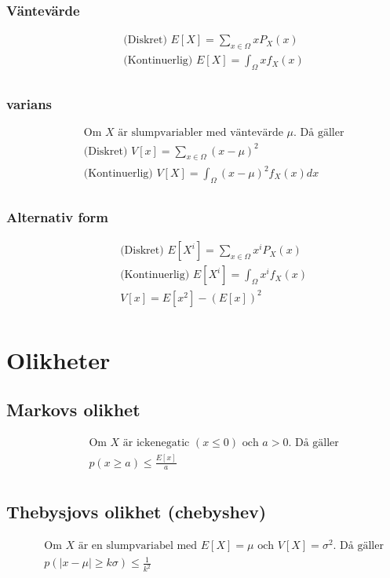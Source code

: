 \subsubsection{Väntevärde}
\begin{align*}
  &\quad  \text{(Diskret) }      E[X] = \sum_{x\in\Omega} x P_X(x) \\
  &\quad  \text{(Kontinuerlig) } E[X] = \int_{\Omega} x f_X(x) \\
\end{align*}

\subsubsection{varians}
\begin{align*}
  &\quad  \text{Om $X$ är slumpvariabler med väntevärde $\mu$. Då gäller} \\
  &\quad  \text{(Diskret) }      V[x] = \sum_{x\in\Omega} (x-\mu)^2  \\
  &\quad  \text{(Kontinuerlig) } V[X] = \int_{\Omega} (x-\mu)^2 f_X(x)dx \\
\end{align*}

\subsubsection{Alternativ form}
\begin{align*}
  &\quad  \text{(Diskret) }      E[X^i] = \sum_{x\in\Omega} x^i P_X(x) \\
  &\quad  \text{(Kontinuerlig) } E[X^i] = \int_{\Omega} x^i f_X(x) \\
  &\quad  V[x]=E[x^2]-(E[x])^2 \\
\end{align*}

\section{Olikheter}
\subsection{Markovs olikhet}
\begin{align*}
  &\quad  \text{Om $X$ är ickenegatic $(x\leq{0})$ och $a>0$. Då gäller} \\
  &\quad  p(x\geq{a}) \leq \frac{E[x]}{a} \\
\end{align*}

\subsection{Thebysjovs olikhet (chebyshev)}
\begin{align*}
  &\quad  \text{Om $X$ är en slumpvariabel med $E[X]=\mu$ och $V[X]=\sigma^2$. Då gäller} \\
  &\quad  p(|x-\mu| \geq{k\sigma}) \leq \frac{1}{k^2} \\
\end{align*}

